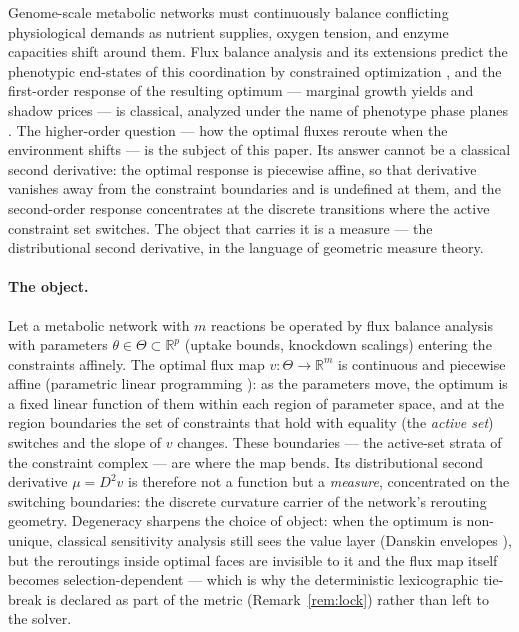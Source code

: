 \documentclass[11pt,a4paper]{article}
\theoremstyle{plain}
\theoremstyle{definition}
\theoremstyle{remark}
\newcommand{\RR}{\mathbb{R}}
\begin{document}
Genome-scale metabolic networks must continuously balance conflicting
physiological demands as nutrient supplies, oxygen tension, and enzyme
capacities shift around them. Flux balance analysis and its extensions
predict the phenotypic end-states of this coordination by constrained
optimization \citep{varma1994, orth2010, lewis2010}, and the
first-order response of the resulting optimum --- marginal growth
yields and shadow prices --- is classical, analyzed under the name of
phenotype phase planes \citep{edwards2001, ibarra2002}. The
higher-order question --- how the optimal fluxes reroute when the
environment shifts --- is the subject of this paper. Its answer
cannot be a classical second derivative: the optimal response is
piecewise affine, so that derivative vanishes away from the
constraint boundaries and is undefined at them, and the second-order
response concentrates at the discrete transitions where the active
constraint set switches. The object that carries it is a measure ---
the distributional second derivative, in the language of geometric
measure theory.

\paragraph{The object.}
Let a metabolic network with $m$ reactions be operated by flux balance
analysis \citep{varma1994, orth2010} with parameters $\theta \in \Theta \subset \RR^p$
(uptake bounds, knockdown scalings) entering the constraints
affinely. The optimal flux map $v : \Theta \to \RR^m$ is continuous
and piecewise affine (parametric linear programming
\citep{borrelli2003}): as the parameters move, the optimum is a fixed
linear function of them within each region of parameter space, and at
the region boundaries the set of constraints that hold with equality
(the \emph{active set}) switches and the slope of $v$ changes. These
boundaries --- the active-set strata of the constraint complex --- are
where the map bends. Its distributional second derivative
$\mu = D^2 v$ is therefore not a function but a \emph{measure},
concentrated on the switching boundaries: the discrete curvature
carrier of the network's rerouting geometry. Degeneracy sharpens the
choice of object: when the optimum is non-unique, classical
sensitivity analysis still sees the value layer (Danskin envelopes
\citep{danskin1967}), but the reroutings inside optimal faces are
invisible to it and the flux map itself becomes
selection-dependent --- which is why the deterministic lexicographic
tie-break is declared as part of the metric (Remark~\ref{rem:lock})
rather than left to the solver.
\end{document}
